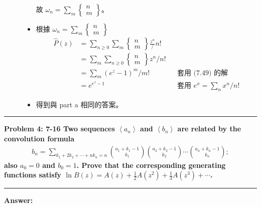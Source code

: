 \documentclass[11pt,fleqn]{article}
\newcommand\question[2]{\vspace{.25in}\hrule\textbf{#1: #2}\vspace{.5em}\hrule\vspace{.10in}}
\renewcommand\part[1]{\vspace{.10in}\textbf{#1}}
\begin{document}
\begin{description}
\begin{itemize}
				故 $\omega_n = \sum_m \begin{Bmatrix}n\\m\end{Bmatrix}$。
			\item 根據 $\omega_n = \sum_m \begin{Bmatrix}n\\m\end{Bmatrix}$
				\begin{align*}
					\widehat{P}(z) &= \sum_{n \ge 0} \sum_m \begin{Bmatrix}n\\m\end{Bmatrix}
						\frac{z^n} / n! \\
					&= \sum_m \sum_{n \ge 0} \begin{Bmatrix}n\\m\end{Bmatrix} z^n / n! \\
					&= \sum_m (e^z-1)^m / m! 
						&& \text{套用 (7.49) 的解}\\
					&= e^{e^z-1}
						&& \text{套用 } e^x = \sum_n x^n / n!
				\end{align*}
			\item 得到與 part a 相同的答案。
		\end{itemize}
\end{description}

\newpage

\question{Problem 4} {7-16 Two sequences $\left \langle a_n \right \rangle$ and 
	$\left \langle  b_n \right \rangle$ are related by the convolution formula
	\begin{align*}
		b_n = \sum_{k_1 + 2k_2 + \cdots + n k_n = n} \binom{a_1+k_1-1}{k_1}
				\binom{a_2+k_2-1}{k_2} \cdots \binom{a_n+k_n-1}{k_n};
	\end{align*}
	also $a_0 = 0$ and $b_0 = 1$. Prove that the corresponding generating functions
	satisfy $\ln B(z) = A(z) + \frac{1}{2} A(z^2) + \frac{1}{3} A(z^3) + \cdots$.
}

\part{Answer:}
\end{document}
